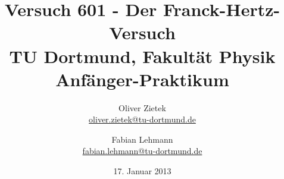 ﻿%


\renewcommand*\rmdefault{iwona}\normalfont\upshape


\title{Versuch 601 - Der Franck-Hertz-Versuch\\				%
\large TU Dortmund, Fakultät Physik\\ 
\normalsize Anfänger-Praktikum}



\author{Oliver Zietek\\			%
{\small \href{oliver.zietek@tu-dortmund.de}{oliver.zietek@tu-dortmund.de}}	%
\and						%
Fabian Lehmann\\					%
{\small \href{fabian.lehmann@tu-dortmund.de}{fabian.lehmann@tu-dortmund.de}}		%
}

\date{17. Januar 2013}%





\maketitle					%
\thispagestyle{empty} 				%

